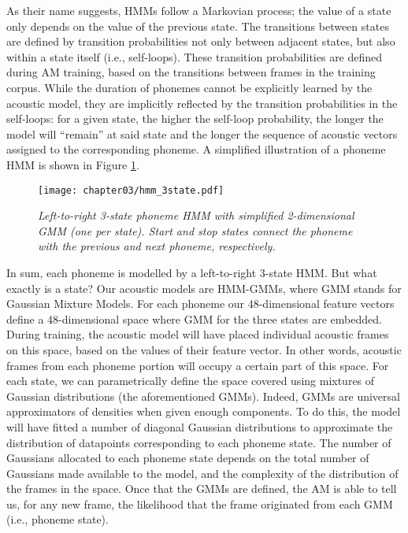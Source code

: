 As their name suggests, HMMs follow a Markovian process; the value of a state only depends on the value of the previous state. The transitions between states are defined by transition probabilities not only between adjacent states, but also within a state itself (i.e., self-loops). These transition probabilities are defined during AM training, based on the transitions between frames in the training corpus. While the duration of phonemes cannot be explicitly learned by the acoustic model, they are implicitly reflected by the transition probabilities in the self-loops: for a given state, the higher the self-loop probability, the longer the model will ``remain'' at said state and the longer the sequence of acoustic vectors assigned to the corresponding phoneme. A simplified illustration of a phoneme HMM is shown in Figure \ref{fig:hmm_3state}.

\begin{figure}[htb]
\centering
\texttt{[image: chapter03/hmm\_3state.pdf]}
\caption{\textit{Left-to-right 3-state phoneme HMM with simplified 2-dimensional GMM (one per state). Start and stop states connect the phoneme with the previous and next phoneme, respectively.}}
\label{fig:hmm_3state}
\end{figure}

In sum, each phoneme is modelled by a left-to-right 3-state HMM. But what exactly is a state? Our acoustic models are HMM-GMMs, where GMM stands for Gaussian Mixture Models. For each phoneme our 48-dimensional feature vectors define a 48-dimensional space where GMM for the three states are embedded. During training, the acoustic model will have placed individual acoustic frames on this space, based on the values of their feature vector. In other words, acoustic frames from each phoneme portion will occupy a certain part of this space. For each state, we can parametrically define the space covered using mixtures of Gaussian distributions (the aforementioned GMMs). Indeed, GMMs are universal approximators of densities when given enough components. To do this, the model will have fitted a number of diagonal Gaussian distributions to approximate the distribution of datapoints corresponding to each phoneme state. The number of Gaussians allocated to each phoneme state depends on the total number of Gaussians made available to the model, and the complexity of the distribution of the frames in the space. Once that the GMMs are defined, the AM is able to tell us, for any new frame, the likelihood that the frame originated from each GMM (i.e., phoneme state).  \\     

